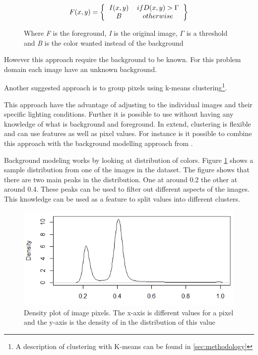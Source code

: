 \begin{figure}[H]
\begin{equation}
F(x,y) = \left \{
\begin{tabular}{cc}
$I(x,y)$ & $if D(x,y) > \Gamma$ \\
$B$      & $otherwise$
\end{tabular}  
\right \}
\end{equation}
\caption{Where \emph{F} is the foreground, \emph{I} is the original image, $\Gamma$ is a threshold and \emph{B} is the color wanted instead of the background}
\end{figure}

However this approach require the background to be known. For this problem domain each image have an unknown background.

Another suggested approach is to group pixels using k-means clustering\footnote{A description of clustering with K-means can be found in \ref{sec:methodology}}.

This approach have the advantage of adjusting to the individual images and their specific lighting conditions. Further it is possible to use without having any knowledge of what is background and foreground. 
In extend, clustering is flexible and can use features as well as pixel values.
For instance is it possible to combine this approach with the background modelling approach from \cite{backgroundRemoval}.
  
Background modeling works by looking at distribution of colors. Figure \ref{fig:pixeldistribution} shows a sample distribution from one of the images in the dataset. The figure shows that there are two main peaks in the distribution. One at around 0.2 the other at around 0.4. 
These peaks can be used to filter out different aspects of the images. This knowledge can be used as a feature to split values into different clusters.
 
\begin{figure}
\centering
\includegraphics[width=\linewidth]{Images/Distribution}
\caption{Density plot of image pixels. The x-axis is different values for a pixel and the y-axis is the density of in the distribution of this value}
\label{fig:pixeldistribution}
\end{figure}











